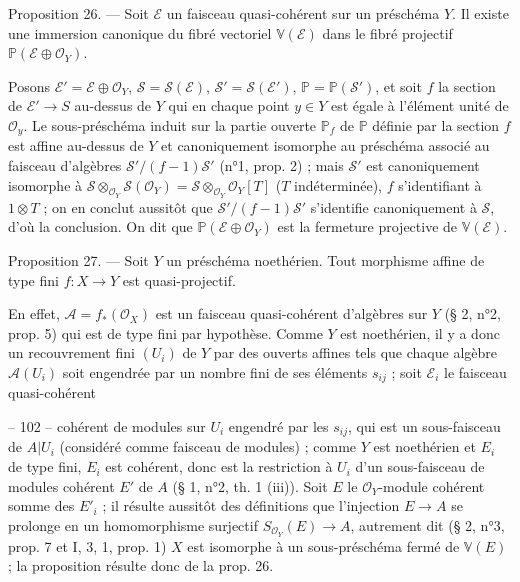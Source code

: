 \medskip

\noindent Proposition 26. — Soit $\mathcal{E}$ un faisceau quasi-cohérent sur un préschéma $Y$. Il existe une immersion canonique du fibré vectoriel $\mathbb{V}(\mathcal{E})$ dans le fibré projectif $\mathbb{P}(\mathcal{E} \oplus \mathcal{O}_Y)$.

\medskip

\noindent Posons $\mathcal{E}' = \mathcal{E} \oplus \mathcal{O}_Y$, $\mathcal{S} = \mathcal{S}(\mathcal{E})$, $\mathcal{S}' = \mathcal{S}(\mathcal{E}')$, $\mathbb{P} = \mathbb{P}(\mathcal{S}')$, et soit $f$ la section de $\mathcal{E}' \to S$ au-dessus de $Y$ qui en chaque point $y \in Y$ est égale à l'élément unité de $\mathcal{O}_y$. Le sous-préschéma induit sur la partie ouverte $\mathbb{P}_f$ de $\mathbb{P}$ définie par la section $f$ est affine au-dessus de $Y$ et canoniquement isomorphe au préschéma associé au faisceau d'algèbres $\mathcal{S}'/(f-1)\mathcal{S}'$ (n°1, prop. 2) ; mais $\mathcal{S}'$ est canoniquement isomorphe à $\mathcal{S} \otimes_{\mathcal{O}_Y} \mathcal{S}(\mathcal{O}_Y) = \mathcal{S} \otimes_{\mathcal{O}_Y} \mathcal{O}_Y[T]$ ($T$ indéterminée), $f$ s'identifiant à $1 \otimes T$ ; on en conclut aussitôt que $\mathcal{S}'/(f-1)\mathcal{S}'$ s'identifie canoniquement à $\mathcal{S}$, d'où la conclusion. On dit que $\mathbb{P}(\mathcal{E} \oplus \mathcal{O}_Y)$ est la fermeture projective de $\mathbb{V}(\mathcal{E})$.

\medskip

\noindent Proposition 27. — Soit $Y$ un préschéma noethérien. Tout morphisme affine de type fini $f : X \to Y$ est quasi-projectif.

\medskip

\noindent En effet, $\mathcal{A} = f_*(\mathcal{O}_X)$ est un faisceau quasi-cohérent d'algèbres sur $Y$ (§ 2, n°2, prop. 5) qui est de type fini par hypothèse. Comme $Y$ est noethérien, il y a donc un recouvrement fini $(U_i)$ de $Y$ par des ouverts affines tels que chaque algèbre $\mathcal{A}(U_i)$ soit engendrée par un nombre fini de ses éléments $s_{ij}$ ; soit $\mathcal{E}_i$ le faisceau quasi-cohérent

\newpage


-- 102 --
cohérent de modules sur $U_i$ engendré par les $s_{ij}$, qui est un sous-faisceau de $A|U_i$ (considéré comme faisceau de modules) ; comme $Y$ est noethérien et $E_i$ de type fini, $E_i$ est cohérent, donc est la restriction à $U_i$ d'un sous-faisceau de modules cohérent $E'$ de $A$ (§ 1, n°2, th. 1 (iii)). Soit $E$ le $\mathcal{O}_Y$-module cohérent somme des $E'_i$ ; il résulte aussitôt des définitions que l'injection $E \to A$ se prolonge en un homomorphisme surjectif $S_{\mathcal{O}_Y}(E) \to A$, autrement dit (§ 2, n°3, prop. 7 et I, 3, 1, prop. 1) $X$ est isomorphe à un sous-préschéma fermé de $\mathbb{V}(E)$ ; la proposition résulte donc de la prop. 26.


